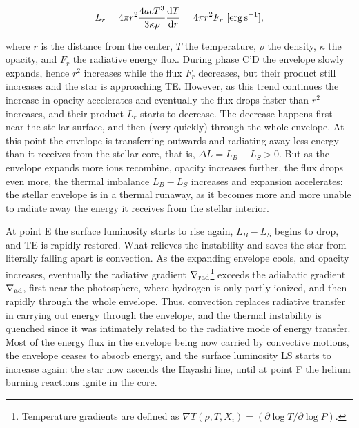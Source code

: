 \documentclass[a4paper,10pt]{article}
\begin{document}
\begin{align*}
    L_r = 4\pi r^2 \frac{4acT^3}{3\kappa\rho} \frac{{\rm d}T}{{\rm d}r} = 4\pi r^2F_r ~ [{\rm erg\,s^{-1}}],
\end{align*}

{\noindent}where $r$ is the distance from the center, $T$ the temperature, $\rho$ the density, $\kappa$ the opacity, and $F_r$ the radiative energy flux. During phase C'D the envelope slowly expands, hence $r^2$ increases while the flux $F_r$ decreases, but their product still increases and the star is approaching TE. However, as this trend continues the increase in opacity accelerates and eventually the flux drops faster than $r^2$ increases, and their product $L_r$ starts to decrease. The decrease happens first near the stellar surface, and then (very quickly) through the whole envelope. At this point the envelope is transferring outwards and radiating away less energy than it receives from the stellar core, that is, $\Delta L=L_B-L_S>0$. But as the envelope expands more ions recombine, opacity increases further, the flux drops even more, the thermal imbalance $L_B-L_S$ increases and expansion accelerates: the stellar envelope is in a thermal runaway, as it becomes more and more unable to radiate away the energy it receives from the stellar interior.

{\noindent}At point E the surface luminosity starts to rise again, $L_B-L_S$ begins to drop, and TE is rapidly restored. What relieves the instability and saves the star from literally falling apart is convection. As the expanding envelope cools, and opacity increases, eventually the radiative gradient $\nabla_{\rm rad}$\footnote{Temperature gradients are defined as $\nabla T(\rho,T,X_i) = (\partial\log T/\partial\log P)$.} exceeds the adiabatic gradient $\nabla_{\rm ad}$, first near the photosphere, where hydrogen is only partly ionized, and then rapidly through the whole envelope. Thus, convection replaces radiative transfer in carrying out energy through the envelope, and the thermal instability is quenched since it was intimately related to the radiative mode of energy transfer. Most of the energy flux in the envelope being now carried by convective motions, the envelope ceases to absorb energy, and the surface luminosity LS starts to increase again: the star now ascends the Hayashi line, until at point F the helium burning reactions ignite in the core.
\end{document}
